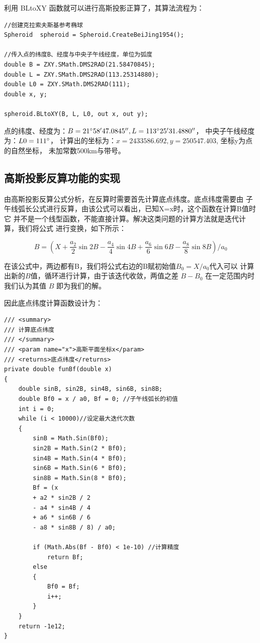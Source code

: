 利用 BLtoXY 函数就可以进行高斯投影正算了，其算法流程为：

\begin{lstlisting}
//创建克拉索夫斯基参考椭球
Spheroid  spheroid = Spheroid.CreateBeiJing1954();

//传入点的纬度B、经度与中央子午线经度，单位为弧度
double B = ZXY.SMath.DMS2RAD(21.58470845);
double L = ZXY.SMath.DMS2RAD(113.25314880);
double L0 = ZXY.SMath.DMS2RAD(111);
double x, y;

spheroid.BLtoXY(B, L, L0, out x, out y);
\end{lstlisting}

点的纬度、经度为：$ B = 21 ^\circ 58'47.0845'',  L= 113^\circ 25'31.4880''$，
中央子午线经度为：$L0 = 111^\circ$，
计算出的坐标为：$x=2433586.692, y=250547.403$, 坐标y为点的自然坐标，
未加常数500km与带号。

\subsection{高斯投影反算功能的实现}
由高斯投影反算公式分析，在反算时需要首先计算底点纬度。底点纬度需要由
子午线弧长公式进行反算，由该公式可以看出，已知X=x时，这个函数在计算B值时它
并不是一个线型函数，不能直接计算。解决这类问题的计算方法就是迭代计算，我们将公式
进行变换，如下所示：

$$B= (X + \frac{a_2}{2}\sin 2B - \frac{a_4}{4}\sin 4B
+ \frac{a_6}{6} \sin 6B  - \frac{a_8}{8}\sin 8B)/a_0$$

在该公式中，两边都有B，我们将公式右边的B赋初始值$B_0=X/a_0$代入可以
计算出新的$B$值，循环进行计算，由于该迭代收敛，两值之差 $B - B_0$ 在一定范围内时
我们认为其值 $B$ 即为我们的解。

因此底点纬度计算函数设计为：

\begin{lstlisting}
/// <summary>
/// 计算底点纬度
/// </summary>
/// <param name="x">高斯平面坐标x</param>
/// <returns>底点纬度</returns>
private double funBf(double x)
{
    double sinB, sin2B, sin4B, sin6B, sin8B;
    double Bf0 = x / a0, Bf = 0; //子午线弧长的初值
    int i = 0;
    while (i < 10000)//设定最大迭代次数
    {
        sinB = Math.Sin(Bf0);
        sin2B = Math.Sin(2 * Bf0);
        sin4B = Math.Sin(4 * Bf0);
        sin6B = Math.Sin(6 * Bf0);
        sin8B = Math.Sin(8 * Bf0);
        Bf = (x
        + a2 * sin2B / 2
        - a4 * sin4B / 4
        + a6 * sin6B / 6
        - a8 * sin8B / 8) / a0;

        if (Math.Abs(Bf - Bf0) < 1e-10) //计算精度
            return Bf;
        else
        {
            Bf0 = Bf;
            i++;
        }
    }
    return -1e12;
}
\end{lstlisting}

